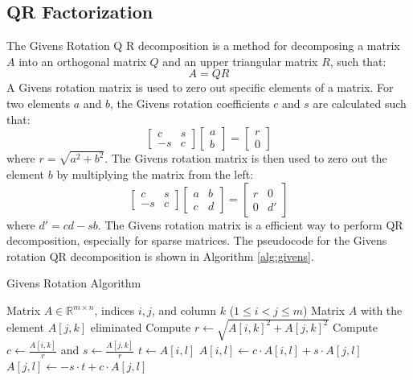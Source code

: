 \documentclass[11pt,a4paper]{article}
\begin{document}
\subsection{QR Factorization}
The Givens Rotation Q R decomposition is a method for decomposing a matrix $A$ into an orthogonal matrix $Q$ and an upper triangular matrix $R$, such that:
\[
    A = Q R
\]
A Givens rotation matrix is used to zero out specific elements of a matrix. For two elements $a$ and $b$, the Givens rotation coefficients $c$ and $s$ are calculated such that:
\[
    \begin{bmatrix}
        c & s \\
        -s & c
    \end{bmatrix}
    \begin{bmatrix}
        a \\
        b
    \end{bmatrix}
    =
    \begin{bmatrix}
        r \\
        0
    \end{bmatrix}
\]
where $r = \sqrt{a^2 + b^2}$. The Givens rotation matrix is then used to zero out the element $b$ by multiplying the matrix from the left:
\[
    \begin{bmatrix}
        c  & s \\
        -s & c
    \end{bmatrix}
    \begin{bmatrix}
        a & b \\
        c & d
    \end{bmatrix}
    =
    \begin{bmatrix}
        r & 0  \\
        0 & d'
    \end{bmatrix}
\]
where $d' = c d - s b$. The Givens rotation matrix is a efficient way to perform QR decomposition, especially for sparse matrices. The pseudocode for the Givens rotation QR decomposition is shown in Algorithm \ref{alg:givens}.

\begin{algorithm}
\caption{Givens Rotation Algorithm}
\begin{algorithmic}[1]
\label{alg:givens}
\REQUIRE Matrix \( A \in \mathbb{R}^{m \times n} \), indices \( i, j \), and column \( k \) (\( 1 \leq i < j \leq m \))
\ENSURE Matrix \( A \) with the element \( A[j, k] \) eliminated
\STATE Compute \( r \gets \sqrt{A[i, k]^2 + A[j, k]^2} \)
\STATE Compute \( c \gets \frac{A[i, k]}{r} \) and \( s \gets \frac{A[j, k]}{r} \)
    \STATE \( t \gets A[i, l] \) 
    \STATE \( A[i, l] \gets c \cdot A[i, l] + s \cdot A[j, l] \)
    \STATE \( A[j, l] \gets -s \cdot t + c \cdot A[j, l] \)
\ENDFOR
\end{algorithmic}
\end{algorithm}
\end{document}
